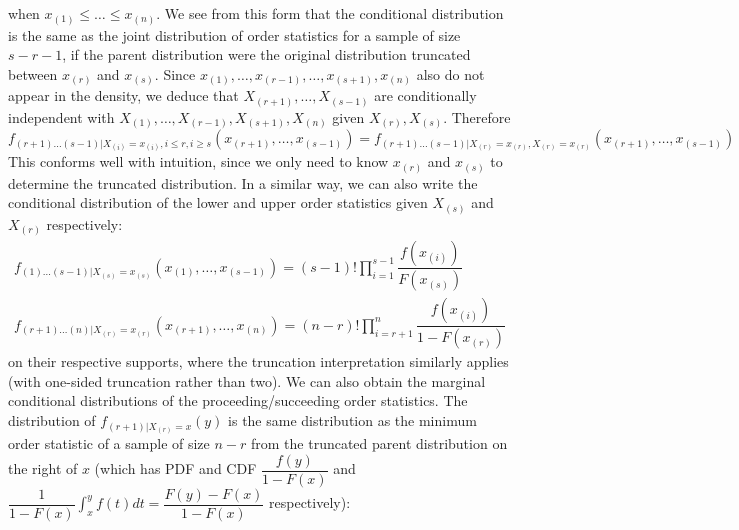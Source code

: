 \documentclass[11pt]{report} %
\begin{document}
when $x_{\left(1\right)} \leq \dots \leq x_{\left(n\right)}$. We see from this form that the conditional distribution is the same as the joint distribution of order statistics for a sample of size $s - r - 1$, if the parent distribution were the original distribution truncated between $x_{\left(r\right)}$ and $x_{\left(s\right)}$. Since $x_{\left(1\right)}, \dots, x_{\left(r - 1\right)}, \dots, x_{\left(s + 1\right)}, x_{\left(n\right)}$ also do not appear in the density, we deduce that $X_{\left(r + 1\right)}, \dots, X_{\left(s - 1\right)}$ are conditionally independent with $X_{\left(1\right)}, \dots, X_{\left(r - 1\right)}, X_{\left(s + 1\right)}, X_{\left(n\right)}$ given $X_{\left(r\right)}, X_{\left(s\right)}$. Therefore
\begin{equation}
f_{\left(r + 1\right)\dots\left(s - 1\right)|X_{\left(i\right)} =  x_{\left(i\right)}, i\leq r, i \geq s}\left(x_{\left(r + 1\right)}, \dots, x_{\left(s - 1\right)}\right) = f_{\left(r + 1\right)\dots\left(s - 1\right)|X_{\left(r\right)} =  x_{\left(r\right)}, X_{\left(r\right)} =  x_{\left(r\right)}}\left(x_{\left(r + 1\right)}, \dots, x_{\left(s - 1\right)}\right)
\end{equation}
This conforms well with intuition, since we only need to know $x_{\left(r\right)}$ and $x_{\left(s\right)}$ to determine the truncated distribution. In a similar way, we can also write the conditional distribution of the lower and upper order statistics given $X_{\left(s\right)}$ and $X_{\left(r\right)}$ respectively:
\begin{gather}
f_{\left(1\right)\dots\left(s-1\right)|X_{\left(s\right)}=x_{\left(s\right)}}\left(x_{\left(1\right)},\dots,x_{\left(s-1\right)}\right)=\left(s-1\right)!\prod_{i=1}^{s-1}\dfrac{f\left(x_{\left(i\right)}\right)}{F\left(x_{\left(s\right)}\right)} \\
f_{\left(r+1\right)\dots\left(n\right)|X_{\left(r\right)}=x_{\left(r\right)}}\left(x_{\left(r+1\right)},\dots,x_{\left(n\right)}\right)=\left(n-r\right)!\prod_{i=r+1}^{n}\dfrac{f\left(x_{\left(i\right)}\right)}{1-F\left(x_{\left(r\right)}\right)}
\end{gather}
on their respective supports, where the truncation interpretation similarly applies (with one-sided truncation rather than two). We can also obtain the marginal conditional distributions of the proceeding/succeeding order statistics. The distribution of $f_{\left(r + 1\right)|X_{\left(r\right)} = x}\left(y\right)$ is the same distribution as the minimum order statistic of a sample of size $n - r$ from the truncated parent distribution on the right of $x$ (which has PDF and CDF $\dfrac{f\left(y\right)}{1 - F\left(x\right)}$ and $\dfrac{1}{1 - F\left(x\right)}\int_{x}^{y}f\left(t\right)dt = \dfrac{F\left(y\right) - F\left(x\right)}{1 - F\left(x\right)}$ respectively):
\end{document}
